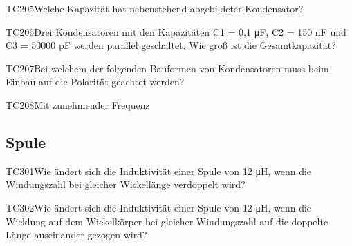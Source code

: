 \begin{question}{TC205}{Welche Kapazität hat nebenstehend abgebildeter Kondensator?}
\end{question}

\begin{question}{TC206}{Drei Kondensatoren mit den Kapazitäten C1 = 0,1 μF, C2 = 150 nF und C3 = 50000 pF werden parallel geschaltet. Wie groß ist die Gesamtkapazität?}
\end{question}

\begin{question}{TC207}{Bei welchem der folgenden Bauformen von Kondensatoren muss beim Einbau auf die Polarität geachtet werden?}
\end{question}

\begin{question}{TC208}{Mit zunehmender Frequenz}
\end{question}

\subsection{Spule}

\begin{question}{TC301}{Wie ändert sich die Induktivität einer Spule von 12 μH, wenn die Windungszahl bei gleicher Wickellänge verdoppelt wird?}
\end{question}

\begin{question}{TC302}{Wie ändert sich die Induktivität einer Spule von 12 μH, wenn die Wicklung auf dem Wickelkörper bei gleicher Windungszahl auf die doppelte Länge auseinander gezogen wird?}
\end{question}

